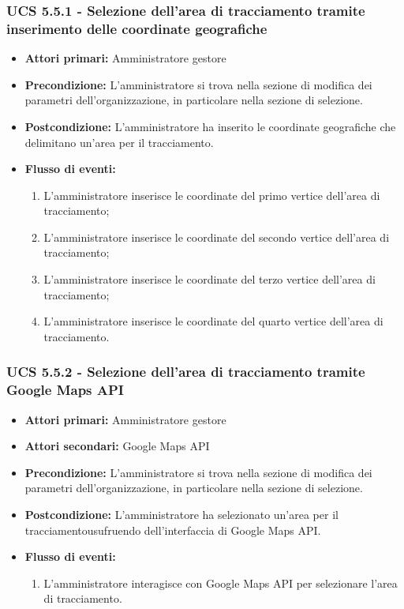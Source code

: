 \subsubsection{UCS 5.5.1 - Selezione dell'area di tracciamento tramite inserimento delle coordinate geografiche}%
\begin{itemize}
\item \textbf{Attori primari:} Amministratore gestore
\item \textbf{Precondizione:} L'amministratore si trova nella sezione di modifica dei parametri dell'organizzazione, in particolare nella sezione di selezione.
\item \textbf{Postcondizione:} L'amministratore ha inserito le coordinate geografiche che delimitano un'area per il tracciamento.
\item \textbf{Flusso di eventi:}
\begin{enumerate}
    \item L'amministratore inserisce le coordinate del primo vertice dell'area di tracciamento;
    \item L'amministratore inserisce le coordinate del secondo vertice dell'area di tracciamento;
    \item L'amministratore inserisce le coordinate del terzo vertice dell'area di tracciamento;
    \item L'amministratore inserisce le coordinate del quarto vertice dell'area di tracciamento.
\end{enumerate}
\end{itemize}

\subsubsection{UCS 5.5.2 - Selezione dell'area di tracciamento tramite Google Maps API}%
\begin{itemize}
\item \textbf{Attori primari:} Amministratore gestore
\item \textbf{Attori secondari:} Google Maps API
\item \textbf{Precondizione:} L'amministratore si trova nella sezione di modifica dei parametri dell'organizzazione, in particolare nella sezione di selezione.
\item \textbf{Postcondizione:} L'amministratore ha selezionato un'area per il tracciamentousufruendo dell'interfaccia di Google Maps API.
\item \textbf{Flusso di eventi:}
\begin{enumerate}
    \item L'amministratore interagisce con Google Maps API per selezionare l'area di tracciamento.
\end{enumerate}
\end{itemize}

